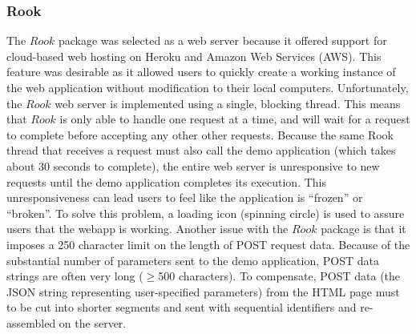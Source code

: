 \subsubsection{Rook}
The $Rook$ package was selected as a web server because it offered support for cloud-based web hosting on Heroku and Amazon Web Services (AWS).  This feature was desirable as it allowed users to quickly create a working instance of the web application without modification to their local computers.  Unfortunately, the $Rook$ web server is implemented using a single, blocking thread.  This means that $Rook$ is only able to handle one request at a time, and will wait for a request to complete before accepting any other other requests.  Because the same Rook thread that receives a request must also call the demo application (which takes about 30 seconds to complete), the entire web server is unresponsive to new requests until the demo application completes its execution.  This unresponsiveness can lead users to feel like the application is ``frozen'' or ``broken''.  To solve this problem, a loading icon (spinning circle) is used to assure users that the webapp is working.  Another issue with the $Rook$ package is that it imposes a 250 character limit on the length of POST request data.  Because of the substantial number of parameters sent to the demo application, POST data strings are often very long ($\ge$500 characters).  To compensate, POST data (the JSON string representing user-specified parameters) from the HTML page must to be cut into shorter segments and sent with sequential identifiers and re-assembled on the server.

